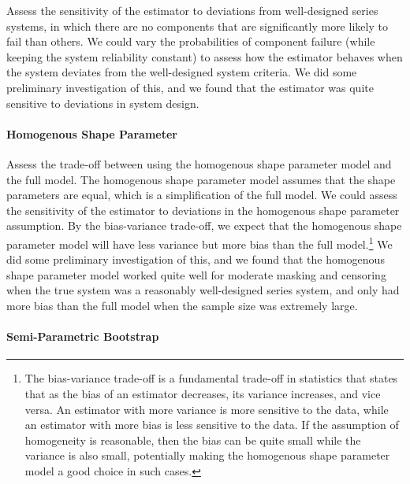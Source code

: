 \documentclass[
]{article}
\theoremstyle{definition}
\theoremstyle{plain}
\theoremstyle{definition}
\theoremstyle{definition}
\theoremstyle{definition}
\theoremstyle{definition}
\theoremstyle{remark}
\begin{document}
Assess the sensitivity of the estimator to deviations from well-designed
series systems, in which there are no components that are significantly more
likely to fail than others. We could vary the probabilities of component failure
(while keeping the system reliability constant) to assess how the estimator
behaves when the system deviates from the well-designed system criteria. We did
some preliminary investigation of this, and we found that the estimator was
quite sensitive to deviations in system design.

\hypertarget{homogenous-shape-parameter}{%
\paragraph*{Homogenous Shape Parameter}\label{homogenous-shape-parameter}}

Assess the trade-off between using the homogenous shape parameter model and the
full model. The homogenous shape parameter model assumes that the shape
parameters are equal, which is a simplification of the full model. We could
assess the sensitivity of the estimator to deviations in the homogenous shape
parameter assumption. By the bias-variance trade-off, we expect that
the homogenous shape parameter model will have less variance but more bias than
the full model.\footnote{The bias-variance trade-off is a fundamental trade-off in statistics
  that states that as the bias of an estimator decreases, its variance
  increases, and vice versa. An estimator with more variance is
  more sensitive to the data, while an estimator with more bias is less
  sensitive to the data. If the assumption of homogeneity is reasonable, then
  the bias can be quite small while the variance is also small, potentially
  making the homogenous shape parameter model a good choice in such cases.} We did some preliminary investigation of this, and we
found that the homogenous shape parameter model worked quite well for
moderate masking and censoring when the true system was a reasonably
well-designed series system, and only had more bias than the full model when
the sample size was extremely large.

\hypertarget{semi-parametric-bootstrap}{%
\paragraph*{Semi-Parametric Bootstrap}\label{semi-parametric-bootstrap}}
\end{document}
